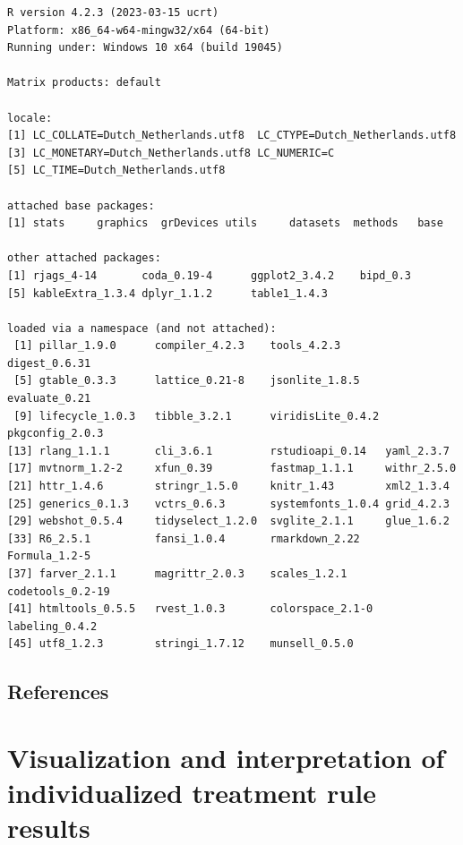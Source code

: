 \documentclass[
  letterpaper,
  DIV=11,
  numbers=noendperiod]{scrreprt}
\begin{document}
\begin{verbatim}
R version 4.2.3 (2023-03-15 ucrt)
Platform: x86_64-w64-mingw32/x64 (64-bit)
Running under: Windows 10 x64 (build 19045)

Matrix products: default

locale:
[1] LC_COLLATE=Dutch_Netherlands.utf8  LC_CTYPE=Dutch_Netherlands.utf8   
[3] LC_MONETARY=Dutch_Netherlands.utf8 LC_NUMERIC=C                      
[5] LC_TIME=Dutch_Netherlands.utf8    

attached base packages:
[1] stats     graphics  grDevices utils     datasets  methods   base     

other attached packages:
[1] rjags_4-14       coda_0.19-4      ggplot2_3.4.2    bipd_0.3        
[5] kableExtra_1.3.4 dplyr_1.1.2      table1_1.4.3    

loaded via a namespace (and not attached):
 [1] pillar_1.9.0      compiler_4.2.3    tools_4.2.3       digest_0.6.31    
 [5] gtable_0.3.3      lattice_0.21-8    jsonlite_1.8.5    evaluate_0.21    
 [9] lifecycle_1.0.3   tibble_3.2.1      viridisLite_0.4.2 pkgconfig_2.0.3  
[13] rlang_1.1.1       cli_3.6.1         rstudioapi_0.14   yaml_2.3.7       
[17] mvtnorm_1.2-2     xfun_0.39         fastmap_1.1.1     withr_2.5.0      
[21] httr_1.4.6        stringr_1.5.0     knitr_1.43        xml2_1.3.4       
[25] generics_0.1.3    vctrs_0.6.3       systemfonts_1.0.4 grid_4.2.3       
[29] webshot_0.5.4     tidyselect_1.2.0  svglite_2.1.1     glue_1.6.2       
[33] R6_2.5.1          fansi_1.0.4       rmarkdown_2.22    Formula_1.2-5    
[37] farver_2.1.1      magrittr_2.0.3    scales_1.2.1      codetools_0.2-19 
[41] htmltools_0.5.5   rvest_1.0.3       colorspace_2.1-0  labeling_0.4.2   
[45] utf8_1.2.3        stringi_1.7.12    munsell_0.5.0    
\end{verbatim}

\hypertarget{references-3}{%
\section*{References}\label{references-3}}



\hypertarget{visualization-and-interpretation-of-individualized-treatment-rule-results}{%
\chapter{Visualization and interpretation of individualized treatment
rule
results}\label{visualization-and-interpretation-of-individualized-treatment-rule-results}}
\end{document}

